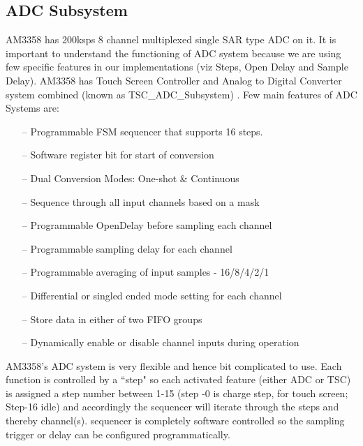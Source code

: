 \subsection{ADC Subsystem}
AM3358 has 200ksps 8 channel multiplexed single SAR type ADC on it. It is important to understand the functioning of ADC system because we are using few specific features in our implementations (viz Steps, Open Delay and Sample Delay). AM3358 has Touch Screen Controller and Analog to Digital Converter system combined (known as TSC\_ADC\_Subsystem) \cite{AM3358TRM} . Few main features of ADC Systems are: 
\begin{itemize}
	\item[--] Programmable FSM sequencer that supports 16 steps.
	\item[--] Software register bit for start of conversion
	\item[--] Dual Conversion Modes: One-shot \& Continuous
	\item[--] Sequence through all input channels based on a mask
	\item[--] Programmable OpenDelay before sampling each channel
	\item[--] Programmable sampling delay for each channel
	\item[--] Programmable averaging of input samples - 16/8/4/2/1
	\item[--] Differential or singled ended mode setting for each channel
	\item[--] Store data in either of two FIFO groups
	\item[--] Dynamically enable or disable channel inputs during operation
\end{itemize}
AM3358's ADC system is very flexible and hence bit complicated to use. Each function is controlled by a ``step" so each activated feature (either ADC or TSC) is assigned a step number between 1-15 (step -0 is charge step, for touch screen; Step-16 idle) and accordingly the sequencer will iterate through the steps and thereby channel(s). sequencer is completely software controlled so the sampling trigger or delay can be configured programmatically.
